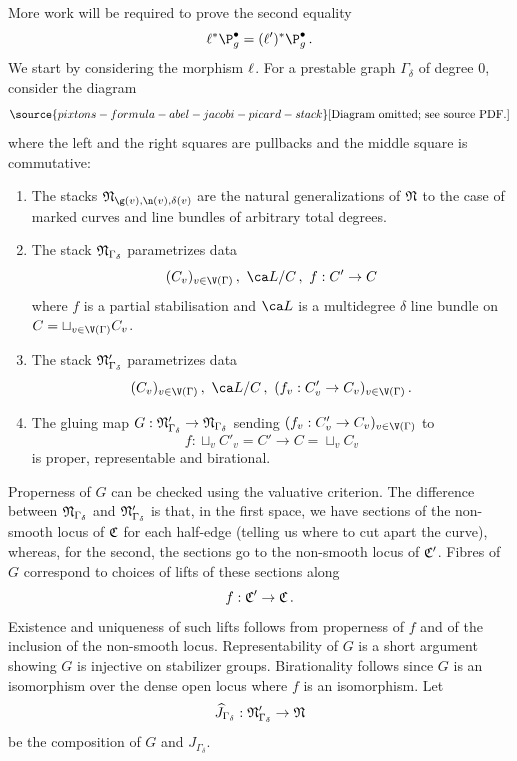 More work will be required to  prove the second equality
$$\targetmap^* \P_{g}^\bullet = (\sourcemap)^* \P_g^\bullet\,
.$$
We start by considering the morphism $\ell$. For a prestable graph $\Gamma_{\delta}$ of degree $0$, consider the diagram
\begin{equation} \label{eqn:frakNdiagramp}
\source{pixtons-formula-abel-jacobi-picard-stack}
\text{[Diagram omitted; see source PDF.]}
\end{equation}
where the left and the right squares are pullbacks and the middle square is commutative:
\begin{enumerate}
\item[$\bullet$] The stacks $\frak N_{\g(v),\n(v),\delta(v)}$ are the natural generalizations of $\frak N$ to the case of marked curves and line bundles of arbitrary total degrees.
\item[$\bullet$]
The stack $\frak N_{\Gamma_{\delta}}$ parametrizes data
\[
(C_v)_{v\in \V(\Gamma)}\,, \,\, \ca L/C\,, \,\, f:C'\to C
\]
where $f$ is a partial stabilisation and $\ca L$ is a multidegree $\delta$ line bundle on $C=\sqcup_{v\in \V(\Gamma)} C_v$.
\item[$\bullet$]
The stack $\frak N'_{\Gamma_{\delta}}$ parametrizes data
\[
(C_v)_{v\in \V(\Gamma)}\,, \,\, \ca L/C\,, \,\, (f_v:C'_v\to C_v)_{v\in \V(\Gamma)}\,.
\]
\item[$\bullet$]
The gluing map $G:\frak N'_{\Gamma_{\delta}} \to \frak N_{\Gamma_{\delta}}$ sending $(f_v:C'_v\to C_v)_{v\in \V(\Gamma)}$ to $$f : \sqcup_v C'_v = C' \to C = \sqcup_v C_v$$ is proper, representable and birational.
\end{enumerate}


Properness of $G$ can be checked using the valuative criterion. %
The difference between $\frak N_{\Gamma_\delta}$ and $\frak N'_{\Gamma_\delta}$ is that, in the first space, we have sections of the non-smooth locus of $\frak C$ for each half-edge (telling us where to cut apart the curve), whereas, for the second, the sections go to the non-smooth locus of $\frak C'$. Fibres of $G$ correspond to choices of lifts of these sections along $$f: \frak C' \to \frak C\, .$$
Existence and uniqueness of such lifts follows from properness of $f$ and of the inclusion of the non-smooth locus.
Representability of $G$ is a short argument showing $G$ is injective on stabilizer groups. Birationality follows since $G$ is an isomorphism over the dense open locus where $f$ is an isomorphism.
Let $$\widehat J_{\Gamma_\delta} : \frak N'_{\Gamma_\delta} \to \frak N$$ be
the composition of $G$ and $J_{\Gamma_\delta}$.

